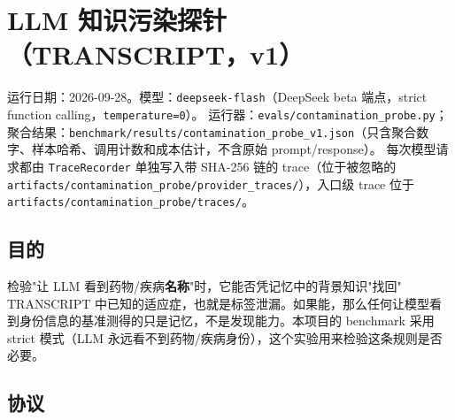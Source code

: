 \documentclass[
  10pt,
]{ctexart}
\author{}
\date{}
\begin{document}
\section{LLM
知识污染探针（TRANSCRIPT，v1）}\label{llm-ux77e5ux8bc6ux6c61ux67d3ux63a2ux9488transcriptv1}

运行日期：2026-09-28。模型：\texttt{deepseek-flash}（DeepSeek beta
端点，strict function calling，\texttt{temperature=0}）。
运行器：\texttt{evals/\allowbreak{}contamination\_\allowbreak{}probe.\allowbreak{}py}；聚合结果：\texttt{benchmark/\allowbreak{}results/\allowbreak{}contamination\_\allowbreak{}probe\_\allowbreak{}v1.\allowbreak{}json}（只含聚合数字、样本哈希、调用计数和成本估计，不含原始
prompt/response）。 每次模型请求都由 \texttt{TraceRecorder} 单独写入带
SHA-256 链的 trace（位于被忽略的
\texttt{artifacts/\allowbreak{}contamination\_\allowbreak{}probe/\allowbreak{}provider\_\allowbreak{}traces/\allowbreak{}}），入口级
trace 位于 \texttt{artifacts/\allowbreak{}contamination\_\allowbreak{}probe/\allowbreak{}traces/\allowbreak{}}。

\subsection{目的}\label{ux76eeux7684}

检验"让 LLM
看到药物/疾病\textbf{名称}"时，它能否凭记忆中的背景知识"找回" TRANSCRIPT
中已知的适应症，也就是标签泄漏。如果能，那么任何让模型看到身份信息的基准测得的只是记忆，不是发现能力。本项目的
benchmark 采用 strict 模式（LLM
永远看不到药物/疾病身份），这个实验用来检验这条规则是否必要。

\subsection{协议}\label{ux534fux8bae}
\end{document}
